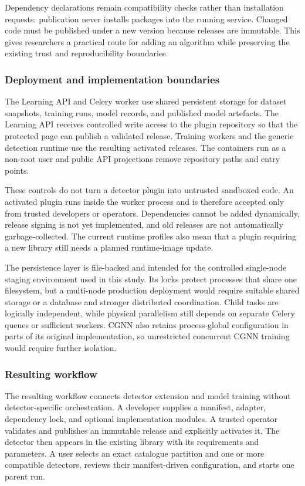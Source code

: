 Dependency declarations remain compatibility checks rather than installation requests: publication never installs packages into the running service. Changed code must be published under a new version because releases are immutable. This gives researchers a practical route for adding an algorithm while preserving the existing trust and reproducibility boundaries.

\subsubsection{Deployment and implementation boundaries}

The Learning API and Celery worker use shared persistent storage for dataset snapshots, training runs, model records, and published model artefacts. The Learning API receives controlled write access to the plugin repository so that the protected page can publish a validated release. Training workers and the generic detection runtime use the resulting activated releases. The containers run as a non-root user and public API projections remove repository paths and entry points.

These controls do not turn a detector plugin into untrusted sandboxed code. An activated plugin runs inside the worker process and is therefore accepted only from trusted developers or operators. Dependencies cannot be added dynamically, release signing is not yet implemented, and old releases are not automatically garbage-collected. The current runtime profiles also mean that a plugin requiring a new library still needs a planned runtime-image update.

The persistence layer is file-backed and intended for the controlled single-node staging environment used in this study. Its locks protect processes that share one filesystem, but a multi-node production deployment would require suitable shared storage or a database and stronger distributed coordination. Child tasks are logically independent, while physical parallelism still depends on separate Celery queues or sufficient workers. CGNN also retains process-global configuration in parts of its original implementation, so unrestricted concurrent CGNN training would require further isolation.

\subsubsection{Resulting workflow}

The resulting workflow connects detector extension and model training without detector-specific orchestration. A developer supplies a manifest, adapter, dependency lock, and optional implementation modules. A trusted operator validates and publishes an immutable release and explicitly activates it. The detector then appears in the existing library with its requirements and parameters. A user selects an exact catalogue partition and one or more compatible detectors, reviews their manifest-driven configuration, and starts one parent run.

